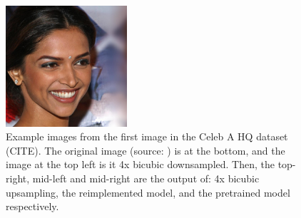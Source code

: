 \documentclass{article}
\begin{document}
\begin{figure}[H]
        \includegraphics[width=0.4\textwidth]{test_data/celeb_a_hq.png}
        \caption{Example images from the first image in the Celeb A HQ dataset (CITE). The original image (source: \citet{liu2015faceattributes}) is at the bottom, and the image at the top left is it 4x bicubic downsampled. Then, the top-right, mid-left and mid-right are the output of: 4x bicubic upsampling, the reimplemented model, and the pretrained model respectively.} \label{example output celeb}
    \end{figure}
\end{document}
